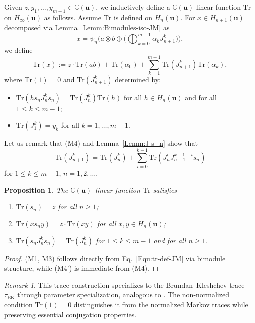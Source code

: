 \documentclass[a4paper, oneside]{amsart}
\numberwithin{equation}{section}
\newtheorem{proposition}[equation]{Proposition}
\theoremstyle{definition}
\theoremstyle{remark}
\newtheorem{remark}[equation]{Remark}
\begin{document}
Given $z, y_1, \ldots, y_{m-1}\in \mathbb{C}(\boldsymbol{u})$, we inductively define a $\mathbb{C}(\boldsymbol{u})$-linear function $\mathrm{Tr}$ on $H_\infty(\boldsymbol{u})$ as follows. Assume $\mathrm{Tr}$ is defined on $H_n(\boldsymbol{u})$. For $x \in H_{n+1}(\boldsymbol{u})$ decomposed via Lemma~\ref{Lemm:Bimodules-iso-JM} as
\[x = \psi_n\biggl(a \otimes b \oplus \biggl(\bigoplus_{k=0}^{m-1} \alpha_k J_{n+1}^k\biggr)\biggr),\]
we define
\begin{equation}\label{Equ:tr-def-JM}
\mathrm{Tr}(x) :=z\cdot\mathrm{Tr}(ab) + \mathrm{Tr}(\alpha_0) + \sum_{k=1}^{m-1} \mathrm{Tr}(J_{n+1}^k) \mathrm{Tr}(\alpha_k),
\end{equation}
where $\mathrm{Tr}(1) = 0$ and $\mathrm{Tr}(J_{n+1}^k)$ determined by:
\begin{itemize}
\item[(M4)] $\mathrm{Tr}(h s_n J_{n}^k s_n) = \mathrm{Tr}(J_{n}^k) \mathrm{Tr}(h)$ for all $h \in H_n(\boldsymbol{u})$ and for all $1 \leq k \leq m-1$;
\item[(M5)] $\mathrm{Tr}(J_1^k) =y_k$ for all $k=1,\ldots,m-1$.
\end{itemize}
Let us remark that (M4) and Lemma~\ref{Lemm:J-s_n} show that
\begin{equation*}
  \mathrm{Tr}(J_{n+1}^k)=\mathrm{Tr}(J_{n}^k)+\sum_{i=0}^{k-1} \mathrm{Tr}(J_n^iJ_{n+1}^{k-1-i}s_n)
\end{equation*}
for $1\leq k\leq m-1$, $n=1,2,\ldots$.

\begin{proposition}\label{Prop:Tr-M}
The $\mathbb{C}(\boldsymbol{u})$--linear function $\mathrm{Tr}$ satisfies
\begin{enumerate}
\item[(M1)] $\mathrm{Tr}(s_n) = z$ for all $n \geq 1$;
\item[(M3)] $\mathrm{Tr}(x s_n y) = z\cdot\mathrm{Tr}(xy)$ for all $x,y \in H_n(\boldsymbol{u})$;
\item[(M4')] $\mathrm{Tr}(s_n J_n^k s_n) = \mathrm{Tr}(J_n^k)$ for  $1 \leq k \leq m-1$ and for all $n\geq 1$.
\end{enumerate}
\end{proposition}
\begin{proof}(M1, M3) follows directly from Eq.~\eqref{Equ:tr-def-JM} via bimodule structure, while (M4') is immediate from (M4).
\end{proof}

\begin{remark}
This trace construction specializes to the Brundan--Kleshchev trace $\tau_{\mathrm{BK}}$ through parameter specialization, analogous to \cite[Lemma~4.3]{GIM}. The non-normalized condition $\mathrm{Tr}(1)=0$ distinguishes it from the normalized Markov traces while preserving essential conjugation properties.
\end{remark}
\end{document}
